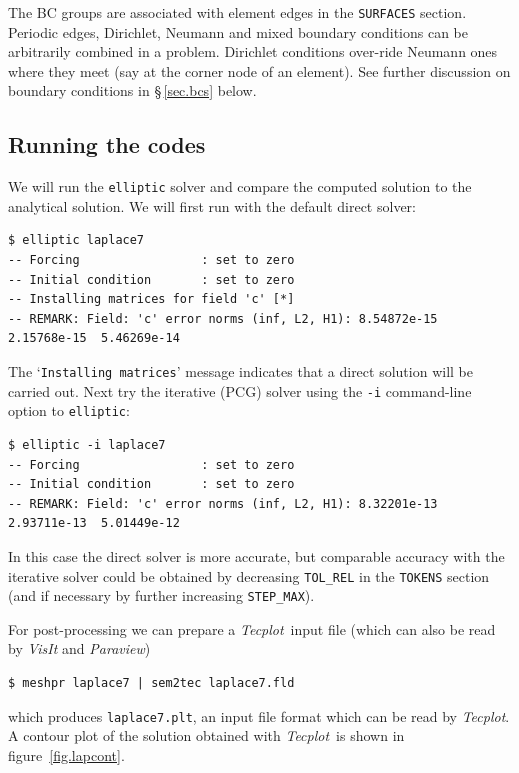 \documentclass[11pt]{report}
\newcommand{\Tecplot}{\emph{Tecplot}}
\begin{document}
The BC groups are associated with element edges in the
\texttt{SURFACES} section.  Periodic edges, Dirichlet, Neumann and
mixed boundary conditions can be arbitrarily combined in a problem.
Dirichlet conditions over-ride Neumann ones where they meet (say at
the corner node of an element). See further discussion on boundary
conditions in \S\,\ref{sec.bcs} below.

\subsection{Running the codes}
\label{sec.runell}

We will run the \verb|elliptic| solver and compare the computed
solution to the analytical solution.  We will first run with the
default direct solver: 
%
{\small
\begin{verbatim}
$ elliptic laplace7
-- Forcing                 : set to zero
-- Initial condition       : set to zero
-- Installing matrices for field 'c' [*]
-- REMARK: Field: 'c' error norms (inf, L2, H1): 8.54872e-15  2.15768e-15  5.46269e-14
\end{verbatim}
}

The `\verb|Installing matrices|' message indicates that a direct
solution will be carried out.  Next try the iterative (PCG) solver
using the \verb+-i+ command-line option to \texttt{elliptic}:
%
{\small
\begin{verbatim}
$ elliptic -i laplace7
-- Forcing                 : set to zero
-- Initial condition       : set to zero
-- REMARK: Field: 'c' error norms (inf, L2, H1): 8.32201e-13  2.93711e-13  5.01449e-12
\end{verbatim}
}
\noindent
In this case the direct solver is more accurate, but comparable
accuracy with the iterative solver could be obtained by decreasing
\verb+TOL_REL+ in the \texttt{TOKENS} section (and if necessary by
further increasing \verb+STEP_MAX+).

For post-processing we can prepare a \Tecplot\ input file (which can
also be read by \emph{VisIt} and \emph{Paraview})
%
{\small
\begin{verbatim}
$ meshpr laplace7 | sem2tec laplace7.fld
\end{verbatim}
}
%
\noindent
which produces \verb|laplace7.plt|, an input file format which can be
read by \Tecplot.  A contour plot of the solution obtained with
\Tecplot\ is shown in figure~\ref{fig.lapcont}.
\end{document}
